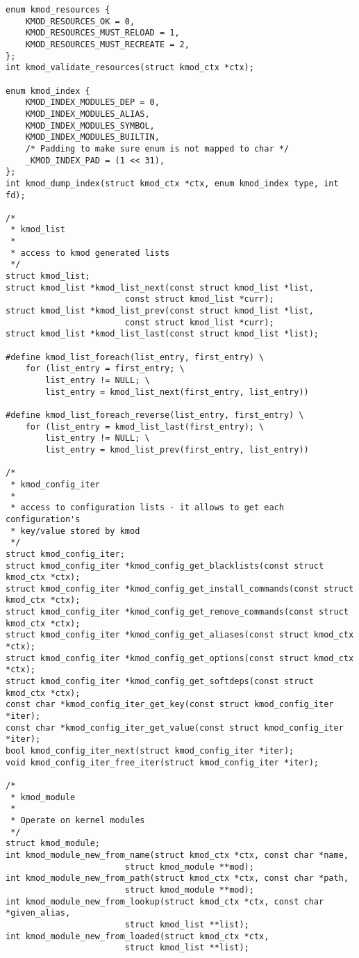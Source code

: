 \documentclass[11pt,a4paper]{article}
\begin{document}
{\begin{shaded}
\begin{verbatim}
enum kmod_resources {
    KMOD_RESOURCES_OK = 0,
    KMOD_RESOURCES_MUST_RELOAD = 1,
    KMOD_RESOURCES_MUST_RECREATE = 2,
};
int kmod_validate_resources(struct kmod_ctx *ctx);

enum kmod_index {
    KMOD_INDEX_MODULES_DEP = 0,
    KMOD_INDEX_MODULES_ALIAS,
    KMOD_INDEX_MODULES_SYMBOL,
    KMOD_INDEX_MODULES_BUILTIN,
    /* Padding to make sure enum is not mapped to char */
    _KMOD_INDEX_PAD = (1 << 31),
};
int kmod_dump_index(struct kmod_ctx *ctx, enum kmod_index type, int fd);

/*
 * kmod_list
 *
 * access to kmod generated lists
 */
struct kmod_list;
struct kmod_list *kmod_list_next(const struct kmod_list *list,
                        const struct kmod_list *curr);
struct kmod_list *kmod_list_prev(const struct kmod_list *list,
                        const struct kmod_list *curr);
struct kmod_list *kmod_list_last(const struct kmod_list *list);

#define kmod_list_foreach(list_entry, first_entry) \
    for (list_entry = first_entry; \
        list_entry != NULL; \
        list_entry = kmod_list_next(first_entry, list_entry))

#define kmod_list_foreach_reverse(list_entry, first_entry) \
    for (list_entry = kmod_list_last(first_entry); \
        list_entry != NULL; \
        list_entry = kmod_list_prev(first_entry, list_entry))

/*
 * kmod_config_iter
 *
 * access to configuration lists - it allows to get each configuration's
 * key/value stored by kmod
 */
struct kmod_config_iter;
struct kmod_config_iter *kmod_config_get_blacklists(const struct kmod_ctx *ctx);
struct kmod_config_iter *kmod_config_get_install_commands(const struct kmod_ctx *ctx);
struct kmod_config_iter *kmod_config_get_remove_commands(const struct kmod_ctx *ctx);
struct kmod_config_iter *kmod_config_get_aliases(const struct kmod_ctx *ctx);
struct kmod_config_iter *kmod_config_get_options(const struct kmod_ctx *ctx);
struct kmod_config_iter *kmod_config_get_softdeps(const struct kmod_ctx *ctx);
const char *kmod_config_iter_get_key(const struct kmod_config_iter *iter);
const char *kmod_config_iter_get_value(const struct kmod_config_iter *iter);
bool kmod_config_iter_next(struct kmod_config_iter *iter);
void kmod_config_iter_free_iter(struct kmod_config_iter *iter);

/*
 * kmod_module
 *
 * Operate on kernel modules
 */
struct kmod_module;
int kmod_module_new_from_name(struct kmod_ctx *ctx, const char *name,
                        struct kmod_module **mod);
int kmod_module_new_from_path(struct kmod_ctx *ctx, const char *path,
                        struct kmod_module **mod);
int kmod_module_new_from_lookup(struct kmod_ctx *ctx, const char *given_alias,
                        struct kmod_list **list);
int kmod_module_new_from_loaded(struct kmod_ctx *ctx,
                        struct kmod_list **list);


\end{verbatim}
\end{shaded}}
\end{document}
